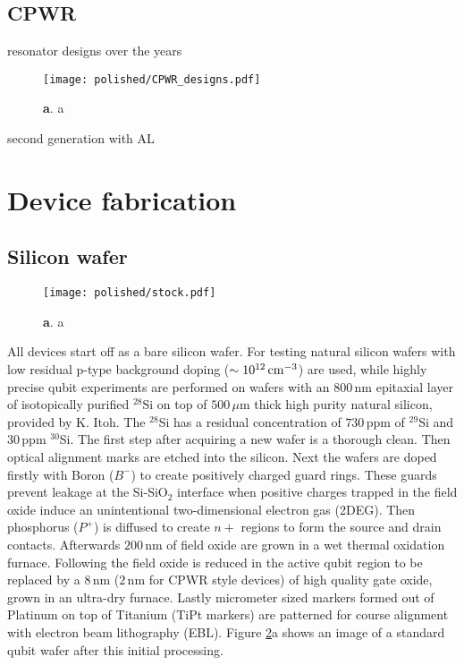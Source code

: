 \subsection{CPWR} \label{sec:designCPWR}
resonator designs over the years

\begin{figure}
	\centering
	\texttt{[image: polished/CPWR\_designs.pdf]}
	\caption[Flip flop design]{\textbf{a}. a }
	\label{fig:designFF}
\end{figure}

second generation with AL


\section{Device fabrication} \label{sec:fabrication}

\subsection{Silicon wafer} \label{sec:fabWafer}

\begin{figure}
	\centering
	\texttt{[image: polished/stock.pdf]}
	\caption[Silicon wafer layout]{\textbf{a}. a }
	\label{fig:wafer}
\end{figure}

All devices start off as a bare silicon wafer. For testing natural silicon wafers with low residual p-type background doping ($\sim 10^{12}\,\rm{cm}^{-3}$) are used, while highly precise qubit experiments are performed on wafers with an $800\,$nm epitaxial layer of isotopically purified $^{28}$Si on top of $500\,\mu$m thick high purity natural silicon, provided by K. Itoh. The $^{28}$Si has a residual concentration of $730\,$ppm of $^{29}$Si and $30\,$ppm $^{30}$Si.
The first step after acquiring a new wafer is a thorough clean. Then optical alignment marks are etched into the silicon. Next the wafers are doped firstly with Boron ($B^-$) to create positively charged guard rings. These guards prevent leakage at the Si-SiO$_2$ interface when positive charges trapped in the field oxide induce an unintentional two-dimensional electron gas (2DEG). Then phosphorus ($P^+$) is diffused to create $n+$ regions to form the source and drain contacts. Afterwards $200\,$nm of field oxide are grown in a wet thermal oxidation furnace. Following the field oxide is reduced in the active qubit region to be replaced by a $8\,$nm ($2\,$nm for CPWR style devices) of high quality gate oxide, grown in an ultra-dry furnace. Lastly micrometer sized markers formed out of Platinum on top of Titanium (TiPt markers) are patterned for course alignment with electron beam lithography (EBL). Figure \ref{fig:wafer}a shows an image of a standard qubit wafer after this initial processing. 

